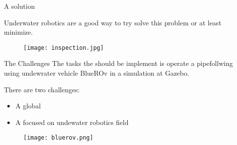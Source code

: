 \begin{frame}[t]{A solution} 

    Underwater robotics are a good way to try solve this problem or at least minimize.



    \begin{center}
        \begin{figure}
            \texttt{[image: inspection.jpg]}               
           
        \end{figure}

        \end{center}
    

\end{frame}


\begin{frame}[t]{The Challenges} 
   The tasks the should be implement is operate a pipefollwing using  undewrater vehicle BlueROv in a simulation at Gazebo.

   There are two challenges: \\
   \begin{itemize}

      \item A global
      \item A focused on undewater robotics field
   \end{itemize}

   \begin{center}
    \begin{figure}
        \texttt{[image: bluerov.png]}               
       
    \end{figure}

    \end{center}


\end{frame}


